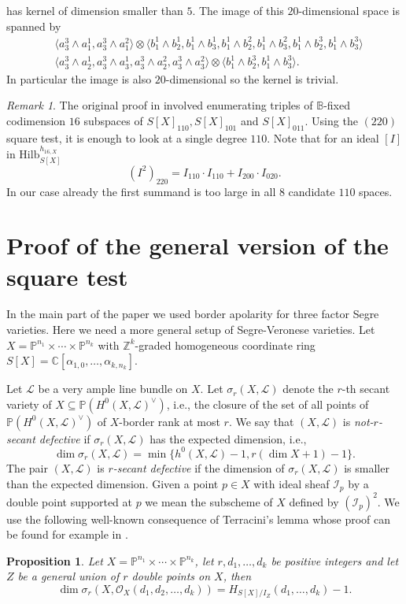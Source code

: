 \documentclass[12pt]{amsart}
\newtheorem{proposition}[theorem]{Proposition}
\theoremstyle{definition}
\theoremstyle{remark}
\newtheorem{remark}[theorem]{Remark}
\theoremstyle{definition}
\newcommand{\LL}{\mathcal{L}}
\newcommand{\CC}{\mathbb{C}}
\newcommand{\OO}{\mathcal{O}}
\newcommand{\PP}{\mathbb{P}}
\newcommand{\Hilb}{\mathrm{Hilb}}
\begin{document}
has kernel of dimension smaller than $5$. The image of this $20$-dimensional space is spanned by
\begin{align*}
&\langle a^3_3\wedge a^1_1, a^3_3\wedge a^2_1 \rangle \otimes \langle b^1_1\wedge b^1_2, b^1_1\wedge b^1_3, b^1_1\wedge b^2_2, b^1_1\wedge b^2_3, b^1_1\wedge b^3_2, b^1_1\wedge b^3_3\rangle\\
&\langle a^3_3\wedge a^1_2, a^3_3\wedge a^1_3, a^3_3\wedge a^2_2, a^3_3\wedge a^2_3\rangle \otimes \langle b^1_1\wedge b^3_2, b^1_1\wedge b^3_3\rangle.
\end{align*}
In particular the image is also $20$-dimensional so the kernel is trivial.



\begin{remark}\label{rmk:m3_16}
The original proof in \cite{chl19} involved enumerating triples of $\mathbb{B}$-fixed codimension $16$ subspaces of $S[X]_{110}, S[X]_{101}$ and $S[X]_{011}$. Using the $(220)$ square test, it is enough to look at a single degree $110$. Note that for an ideal $[I]$ in $\Hilb_{S[X]}^{h_{16, X}}$
\[
(I^2)_{220} = I_{110}\cdot I_{110} + I_{200}\cdot I_{020}.
\]
In our case already the first summand is too large in all $8$ candidate $110$ spaces. 
\end{remark}

\section{Proof of the general version of the square test}
In the main part of the paper we used border apolarity for three factor Segre varieties. Here we need a more general setup of Segre-Veronese varieties.
Let $X = \PP^{n_1}\times \cdots \times \PP^{n_k}$ with $\mathbb{Z}^k$-graded homogeneous coordinate ring $S[X]=\CC[\alpha_{1,0},\ldots, \alpha_{k,n_k}]$.

Let $\LL$ be a very ample line bundle on $X$. Let $\sigma_r(X,\LL)$ denote the $r$-th secant variety of $X \subseteq \PP(H^0(X, \LL)^\vee)$, i.e., the closure of the set of all points of $\PP(H^0(X, \LL)^\vee)$ of $X$-border rank at most $r$.
We say that $(X,\LL)$ is \emph{not-$r$-secant defective} if $\sigma_r(X, \LL)$ has the expected dimension, i.e., 
\[
\dim \sigma_r(X, \LL) = \min \{h^0(X, \LL)-1, r(\dim X+1)-1\}.
\]
The pair $(X,\LL)$ is $r$\emph{-secant defective} if the dimension of $\sigma_r(X,\LL)$ is smaller than the expected dimension. Given a point $p\in X$ with ideal sheaf $\mathcal{I}_p$ by a double point supported at $p$ we mean the subscheme of $X$ defined by $(\mathcal{I}_p)^2$.
We use the following well-known consequence of Terracini's lemma \cite{Ter11} whose proof can be found for example in \cite{CGG05}.
 \begin{proposition}\label{lem:TERRACINI}
     Let $X = \PP^{n_1}\times \cdots \times \PP^{n_k}$, let $r, d_1,\ldots, d_k$ be positive integers and let $Z$ be a general union of $r$ double points on $X$, then 
     \[
     \dim \sigma_r(X, \OO_X(d_1,d_2,\ldots, d_k)) = H_{S[X]/I_Z}(d_1,\ldots, d_k)-1.
     \]
 \end{proposition}
 
\end{document}
